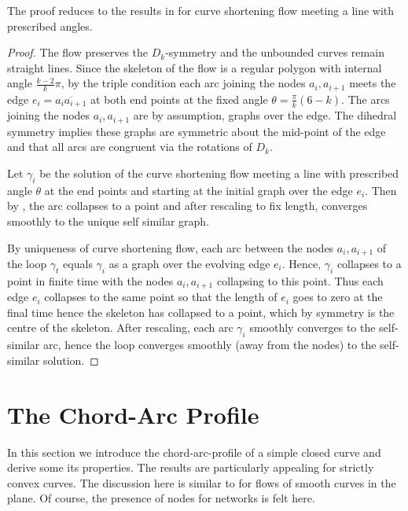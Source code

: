 \documentclass[12pt]{amsart}
\begin{document}
The proof reduces to the results in \cite{MR2794911} for curve shortening flow meeting a line with prescribed angles.

\begin{proof}
The flow preserves the \(D_k\)-symmetry and the unbounded curves remain straight lines. Since the skeleton of the flow is a regular polygon with internal angle \(\tfrac{k-2}{k} \pi\), by the triple condition each arc joining the nodes \(a_i, a_{i+1}\) meets the edge \(e_i = \overline{a_i a_{i+1}}\) at both end points at the fixed angle \(\theta = \tfrac{\pi}{k}(6 - k)\). The arcs joining the nodes \(a_i, a_{i+1}\) are by assumption, graphs over the edge. The dihedral symmetry implies these graphs are symmetric about the mid-point of the edge and that all arcs are congruent via the rotations of \(D_k\).

Let \(\gamma_i\) be the solution of the curve shortening flow meeting a line with prescribed angle \(\theta\) at the end points and starting at the initial graph over the edge \(e_i\). Then by \cite{MR2794911}, the arc collapses to a point and after rescaling to fix length, converges smoothly to the unique self similar graph.

By uniqueness of curve shortening flow, each arc between the nodes \(a_i, a_{i+1}\) of the loop \(\gamma_t\) equals \(\gamma_i\) as a graph over the evolving edge \(e_i\).  Hence, \(\gamma_i\) collapses to a point in finite time with the nodes \(a_i, a_{i+1}\) collapsing to this point. Thus each edge \(e_i\) collapses to the same point so that the length of \(e_i\) goes to zero at the final time hence the skeleton has collapsed to a point, which by symmetry is the centre of the skeleton. After rescaling, each arc \(\gamma_i\) smoothly converges to the self-similar arc, hence the loop converges smoothly (away from the nodes) to the self-similar solution.
\end{proof}

\section{The Chord-Arc Profile}
\label{sec:orgheadline10}

In this section we introduce the chord-arc-profile of a simple closed curve and derive some its properties. The results are particularly appealing for strictly convex curves. The discussion here is similar to \cite{alpha_csf_dist_comp} for flows of smooth curves in the plane. Of course, the presence of nodes for networks is felt here.
\end{document}
